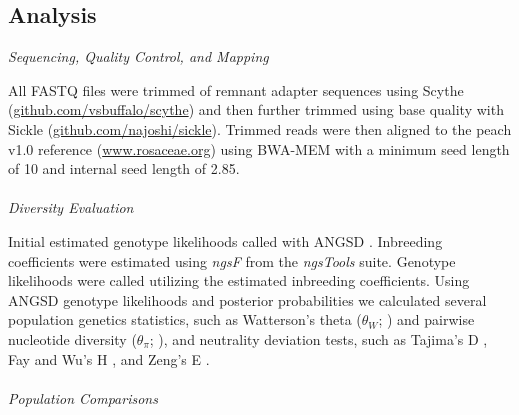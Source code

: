 \documentclass[12pt]{article}
\newcommand{\jri}[1]{\textcolor{red}{\emph{#1}}}
\newcommand{\dv}[1]{\textcolor{blue}{\emph{#1}}}
\begin{document}
\subsection*{Analysis}
\emph{Sequencing, Quality Control, and Mapping}

%
All FASTQ files were trimmed of remnant adapter sequences using Scythe (\url{github.com/vsbuffalo/scythe}) and then further trimmed using base quality with Sickle (\url{github.com/najoshi/sickle}). 
%
Trimmed reads were then aligned to the peach v1.0 reference (\url{www.rosaceae.org}) using BWA-MEM  \citep{li2013aligning} with a minimum seed length of 10 and internal seed length of 2.85.
\\
%
%
\\
\emph{Diversity Evaluation}

Initial estimated genotype likelihoods called with ANGSD \citep{korneliussen2014angsd}. 
%
Inbreeding coefficients were estimated using \emph{ngsF} from the \emph{ngsTools} \citep{fumagalli2014ngstools} suite.
%
Genotype likelihoods were called utilizing the estimated inbreeding coefficients. 
%
Using ANGSD genotype likelihoods and posterior probabilities we calculated several population genetics statistics, such as Watterson's theta ($\theta_{W}$; \citealp{watterson1975number}) and pairwise nucleotide diversity ($\theta_{\pi}$; \citealp{nei1979mathematical}), and neutrality deviation tests, such as Tajima's D \citep{tajima1989statistical}, Fay and Wu's H \citep{fay2000hitchhiking}, and Zeng's E \citep{zeng2006statistical}.
\\
%
\\
\emph{Population Comparisons}
\end{document}
